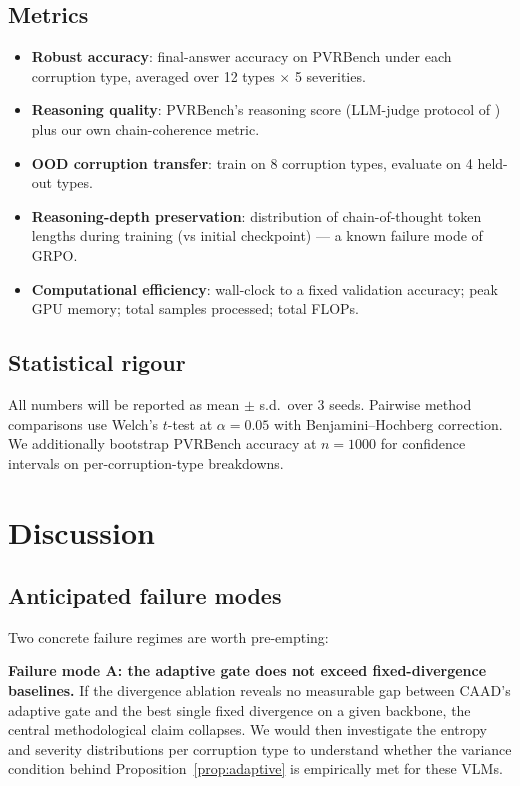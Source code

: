 \documentclass{article}
\newcommand{\caad}{\textsc{CAAD}}
\begin{document}
\subsection{Metrics}

\begin{itemize}[leftmargin=*,nosep]
\item \textbf{Robust accuracy}: final-answer accuracy on PVRBench under each corruption type, averaged over 12 types $\times$ 5 severities.
\item \textbf{Reasoning quality}: PVRBench's reasoning score (LLM-judge protocol of \citet{he2026rova}) plus our own chain-coherence metric.
\item \textbf{OOD corruption transfer}: train on 8 corruption types, evaluate on 4 held-out types.
\item \textbf{Reasoning-depth preservation}: distribution of chain-of-thought token lengths during training (vs initial checkpoint) --- a known failure mode of GRPO.
\item \textbf{Computational efficiency}: wall-clock to a fixed validation accuracy; peak GPU memory; total samples processed; total FLOPs.
\end{itemize}

\subsection{Statistical rigour}

All numbers will be reported as mean $\pm$ s.d.\ over 3 seeds. Pairwise method comparisons use Welch's $t$-test at $\alpha = 0.05$ with Benjamini--Hochberg correction. We additionally bootstrap PVRBench accuracy at $n = 1000$ for confidence intervals on per-corruption-type breakdowns.

\section{Discussion}

\subsection{Anticipated failure modes}

Two concrete failure regimes are worth pre-empting:

\textbf{Failure mode A: the adaptive gate does not exceed fixed-divergence baselines.} If the divergence ablation reveals no measurable gap between \caad{}'s adaptive gate and the best single fixed divergence on a given backbone, the central methodological claim collapses. We would then investigate the entropy and severity distributions per corruption type to understand whether the variance condition behind Proposition~\ref{prop:adaptive} is empirically met for these VLMs.
\end{document}
